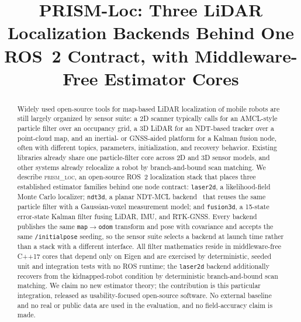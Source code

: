 \documentclass[conference]{IEEEtran}
\newcommand{\prismloc}{\textsc{prism\_loc}}
\begin{document}
\title{PRISM-Loc: Three LiDAR Localization Backends Behind One
ROS~2 Contract, with Middleware-Free Estimator Cores}

\author{
}

\maketitle

\begin{abstract}
Widely used open-source tools for map-based LiDAR localization of mobile
robots are still largely organized by sensor suite: a 2D scanner
typically calls for an AMCL-style particle filter over an occupancy
grid, a 3D LiDAR for an NDT-based tracker over a point-cloud map, and an
inertial- or GNSS-aided platform for a Kalman fusion node, often with
different topics, parameters, initialization, and recovery behavior.
Existing libraries already share one particle-filter core across 2D and
3D sensor models, and other systems already relocalize a robot by
branch-and-bound scan matching. We describe \prismloc{}, an open-source
ROS~2 localization stack that places three established estimator
families behind one node contract: \texttt{laser2d}, a likelihood-field
Monte Carlo localizer; \texttt{ndt3d}, a planar NDT-MCL
backend~\cite{saarinen2013ndtmcl} that reuses the same particle filter
with a Gaussian-voxel measurement model; and \texttt{fusion3d}, a
15-state error-state Kalman filter fusing LiDAR, IMU, and RTK-GNSS.
Every backend publishes the same \texttt{map}$\to$\texttt{odom}
transform and pose with covariance and accepts the same
\texttt{/initialpose} seeding, so the sensor suite selects a backend at
launch time rather than a stack with a different interface. All filter
mathematics reside in middleware-free C++17 cores that depend only on
Eigen and are exercised by deterministic, seeded unit and integration
tests with no ROS runtime; the \texttt{laser2d} backend additionally
recovers from the kidnapped-robot condition by deterministic
branch-and-bound scan matching. We claim no new estimator theory; the
contribution is this particular integration, released as
usability-focused open-source software. No external baseline and no
real or public data are used in the evaluation, and no field-accuracy
claim is made.
\end{abstract}












\end{document}
